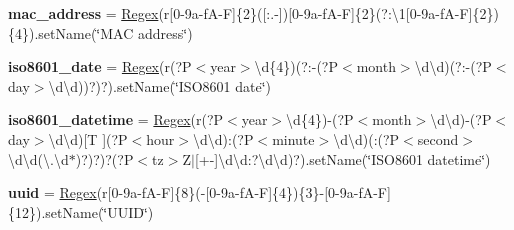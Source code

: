\begin{DoxyCompactItemize}
{\bfseries mac\+\_\+address} = \hyperlink{classpkg__resources_1_1__vendor_1_1pyparsing_1_1_regex}{Regex}(r\textquotesingle{}\mbox{[}0-\/9a-\/f\+A-\/\+F\mbox{]}\{2\}(\mbox{[}\+:.-\/\mbox{]})\mbox{[}0-\/9a-\/f\+A-\/\+F\mbox{]}\{2\}(?\+:\textbackslash{}1\mbox{[}0-\/9a-\/f\+A-\/\+F\mbox{]}\{2\})\{4\}\textquotesingle{}).\+set\+Name(\char`\"{}\+M\+A\+C address\char`\"{})
\item 
\mbox{\label{classpkg__resources_1_1__vendor_1_1pyparsing_1_1pyparsing__common_a9d0a3028b04314960dbd514249afd1c4}} 
{\bfseries iso8601\+\_\+date} = \hyperlink{classpkg__resources_1_1__vendor_1_1pyparsing_1_1_regex}{Regex}(r\textquotesingle{}(?P$<$year$>$\textbackslash{}d\{4\})(?\+:-\/(?P$<$month$>$\textbackslash{}d\textbackslash{}d)(?\+:-\/(?P$<$day$>$\textbackslash{}d\textbackslash{}d))?)?\textquotesingle{}).set\+Name(\char`\"{}I\+S\+O8601 date\char`\"{})
\item 
\mbox{\label{classpkg__resources_1_1__vendor_1_1pyparsing_1_1pyparsing__common_a044e272a628ed58e4ae1efa5652f796c}} 
{\bfseries iso8601\+\_\+datetime} = \hyperlink{classpkg__resources_1_1__vendor_1_1pyparsing_1_1_regex}{Regex}(r\textquotesingle{}(?P$<$year$>$\textbackslash{}d\{4\})-\/(?P$<$month$>$\textbackslash{}d\textbackslash{}d)-\/(?P$<$day$>$\textbackslash{}d\textbackslash{}d)\mbox{[}T \mbox{]}(?P$<$hour$>$\textbackslash{}d\textbackslash{}d)\+:(?P$<$minute$>$\textbackslash{}d\textbackslash{}d)(\+:(?P$<$second$>$\textbackslash{}d\textbackslash{}d(\textbackslash{}.\textbackslash{}d$\ast$)?)?)?(?P$<$tz$>$Z$\vert$\mbox{[}+-\/\mbox{]}\textbackslash{}d\textbackslash{}d\+:?\textbackslash{}d\textbackslash{}d)?\textquotesingle{}).set\+Name(\char`\"{}I\+S\+O8601 datetime\char`\"{})
\item 
\mbox{\label{classpkg__resources_1_1__vendor_1_1pyparsing_1_1pyparsing__common_afe6b58bb25874a191a21aea2a19c8366}} 
{\bfseries uuid} = \hyperlink{classpkg__resources_1_1__vendor_1_1pyparsing_1_1_regex}{Regex}(r\textquotesingle{}\mbox{[}0-\/9a-\/f\+A-\/\+F\mbox{]}\{8\}(-\/\mbox{[}0-\/9a-\/f\+A-\/\+F\mbox{]}\{4\})\{3\}-\/\mbox{[}0-\/9a-\/f\+A-\/\+F\mbox{]}\{12\}\textquotesingle{}).\+set\+Name(\char`\"{}\+U\+U\+I\+D\char`\"{})
\item 
\mbox{\label{classpkg__resources_1_1__vendor_1_1pyparsing_1_1pyparsing__common_a66395be311bf0493a0fbbb0e70a313c4}} 

\end{DoxyCompactItemize}
